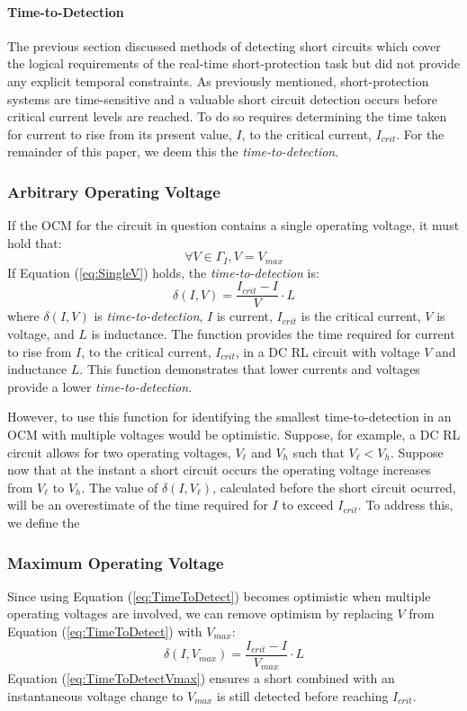 \paragraph{Time-to-Detection}
The previous section discussed methods of detecting short circuits which cover the logical requirements of the real-time short-protection task but did not provide any explicit temporal constraints.
As previously mentioned, short-protection systems are time-sensitive and a valuable short circuit detection occurs before critical current levels are reached.
To do so requires determining the time taken for current to rise from its present value, $I$, to the critical current, $I_{crit}$.
For the remainder of this paper, we deem this the \textit{time-to-detection}.

\subsubsection{Arbitrary Operating Voltage}
If the OCM for the circuit in question contains a single operating voltage, it must hold that:
\begin{equation}\label{eq:SingleV}
\forall  V  \in \Gamma_{I}, V = V_{max}
\end{equation}
If Equation (\ref{eq:SingleV}) holds, the \textit{time-to-detection}  is:
\begin{equation}\label{eq:TimeToDetect}
\delta(I,V) = \frac{I_{crit}-I}{V}\cdot L
\end{equation}
where $\delta(I,V)$ is \textit{time-to-detection}, $I$ is current, $I_{crit}$ is the critical current, $V$ is voltage, and $L$ is inductance.
The function provides the time required for current to rise from $I$, to the critical current, $I_{crit}$, in a DC RL circuit with voltage $V$ and inductance $L$.
This function demonstrates that lower currents and voltages provide a lower \textit{time-to-detection}.
    
However, to use this function for identifying the smallest time-to-detection in an OCM with multiple voltages would be optimistic.
Suppose, for example, a DC RL circuit allows for two operating voltages, $V_\ell$ and $V_h$ such that $V_\ell < V_h$.
Suppose now that at the instant a short circuit occurs the operating voltage increases from $V_\ell$ to $V_h$.
The value of $\delta(I,V_\ell)$, calculated before the short circuit ocurred, will be an overestimate of the time required for $I$ to exceed $I_{crit}$.
To address this, we define the 

\subsubsection{Maximum Operating Voltage}
Since using Equation (\ref{eq:TimeToDetect}) becomes optimistic when multiple operating voltages are involved, we can remove optimism by replacing $V$ from Equation (\ref{eq:TimeToDetect}) with $V_{max}$:
\begin{equation}\label{eq:TimeToDetectVmax}
\delta(I,V_{max}) = \frac{I_{crit}-I}{V_{max}}\cdot L
\end{equation}
Equation (\ref{eq:TimeToDetectVmax}) ensures a short combined with an instantaneous voltage change to $V_{max}$ is still detected before reaching $I_{crit}$.

